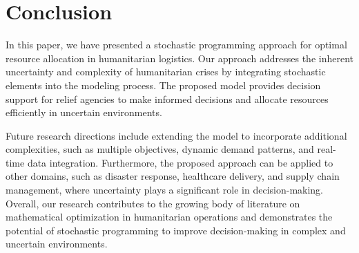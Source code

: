 \documentclass[opre,sglanonrev]{informs4}
\begin{document}
\section{Conclusion}\label{sec:Conclusion}
In this paper, we have presented a stochastic programming approach for optimal resource allocation in humanitarian logistics. Our approach addresses the inherent uncertainty and complexity of humanitarian crises by integrating stochastic elements into the modeling process. The proposed model provides decision support for relief agencies to make informed decisions and allocate resources efficiently in uncertain environments.

Future research directions include extending the model to incorporate additional complexities, such as multiple objectives, dynamic demand patterns, and real-time data integration. Furthermore, the proposed approach can be applied to other domains, such as disaster response, healthcare delivery, and supply chain management, where uncertainty plays a significant role in decision-making. Overall, our research contributes to the growing body of literature on mathematical optimization in humanitarian operations and demonstrates the potential of stochastic programming to improve decision-making in complex and uncertain environments.





\end{document}
